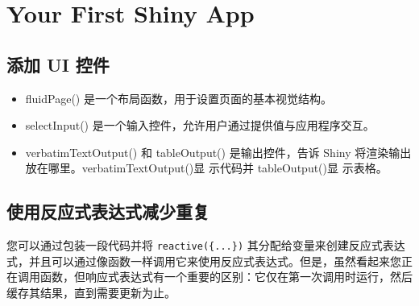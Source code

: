 \chapter{Your First Shiny App\label{ch01}}
\section{添加 UI 控件}
\begin{itemize}
    \item fluidPage() 是一个布局函数，用于设置页面的基本视觉结构。
    \item selectInput() 是一个输入控件，允许用户通过提供值与应用程序交互。
    \item verbatimTextOutput() 和 tableOutput() 是输出控件，告诉 Shiny 将渲染输出放在哪里。verbatimTextOutput()显 示代码并 tableOutput()显 示表格。
\end{itemize}
\section{使用反应式表达式减少重复}
您可以通过包装一段代码并将 \verb|reactive({...})| 其分配给变量来创建反应式表达式，并且可以通过像函数一样调用它来使用反应式表达式。但是，虽然看起来您正在调用函数，但响应式表达式有一个重要的区别：它仅在第一次调用时运行，然后缓存其结果，直到需要更新为止。